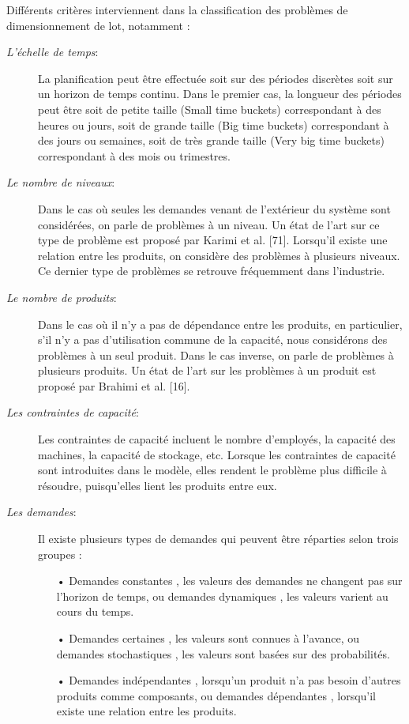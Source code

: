 \documentclass[12pt,a4paper]{article}
\begin{document}
Différents critères interviennent dans la classification des problèmes de dimensionnement de lot, notamment : 
\begin{description}
	\item[\textsl{L'échelle de temps}:] La planification peut être effectuée soit sur des périodes discrètes soit sur un
horizon de temps continu. Dans le premier cas, la longueur des périodes peut
être soit de petite taille (Small time buckets) correspondant à des heures ou
jours, soit de grande taille (Big time buckets) correspondant à des jours ou
semaines, soit de très grande taille (Very big time buckets) correspondant à
des mois ou trimestres.

	\item[\textsl{Le nombre de niveaux}:] Dans le cas où seules les demandes venant de l'extérieur du système sont considérées, on parle de problèmes à un niveau. Un état de l'art sur ce type de problème est proposé par Karimi et al. [71]. Lorsqu'il existe une relation entre
les produits, on considère des problèmes à plusieurs niveaux. Ce dernier type
de problèmes se retrouve fréquemment dans l'industrie.

	\item[\textsl{Le nombre de produits}:] Dans le cas où il n'y a pas de dépendance entre les produits, en particulier, s'il n'y a pas d'utilisation commune de la capacité, nous considérons des problèmes
à un seul produit. Dans le cas inverse, on parle de problèmes à plusieurs produits. Un état de l'art sur les problèmes à un produit est proposé par Brahimi
et al. [16].

	\item[\textsl{Les contraintes de capacité}:] Les contraintes de capacité incluent le nombre d'employés, la capacité des machines, la capacité de stockage, etc. Lorsque les contraintes de capacité sont
introduites dans le modèle, elles rendent le problème plus difficile à résoudre,
puisqu'elles lient les produits entre eux.

	\item[\textsl{Les demandes}:] Il existe plusieurs types de demandes qui peuvent être réparties selon trois
groupes :
	\begin{itemize}
		\item[•] Demandes constantes , les valeurs des demandes ne changent pas sur l'horizon de temps, ou demandes dynamiques , les valeurs varient au cours du temps.
		\item[•] Demandes certaines , les valeurs sont connues à l'avance, ou demandes stochastiques , les valeurs sont basées sur des probabilités.
		\item[•] Demandes indépendantes , lorsqu'un produit n'a pas besoin d'autres produits comme composants, ou demandes dépendantes , lorsqu'il existe une relation
entre les produits.
	\end{itemize}


\end{description}
\end{document}
